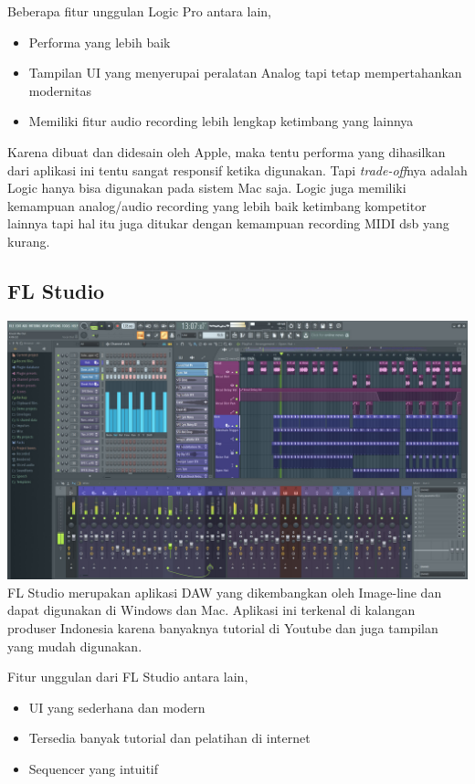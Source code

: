 \documentclass[12pt,a4paper]{report}
\begin{document}
  Beberapa fitur unggulan Logic Pro antara lain,

  \begin{itemize}
  \item
    Performa yang lebih baik
  \item
    Tampilan UI yang menyerupai peralatan
    Analog tapi tetap mempertahankan modernitas
  \item
    Memiliki fitur audio recording lebih lengkap ketimbang yang lainnya
  \end{itemize}

  Karena dibuat dan didesain oleh Apple, maka tentu performa yang
  dihasilkan dari aplikasi ini tentu sangat responsif ketika digunakan.
  Tapi \emph{trade-off}nya adalah Logic hanya bisa digunakan pada sistem
  Mac saja. Logic juga memiliki kemampuan analog/audio recording yang
  lebih baik ketimbang kompetitor lainnya tapi hal itu juga ditukar dengan
  kemampuan recording MIDI dsb yang kurang.

  \subsection*{FL Studio}\label{fl-studio}

  \includegraphics[width=\textwidth]{images/flstudio.jpg}
  FL Studio merupakan aplikasi DAW yang dikembangkan oleh Image-line dan dapat digunakan di Windows dan
  Mac. Aplikasi ini terkenal di kalangan produser Indonesia karena
  banyaknya tutorial di Youtube dan juga tampilan yang mudah digunakan.

  Fitur unggulan dari FL Studio antara lain,

  \begin{itemize}
  \item
    UI yang sederhana dan modern
  \item
    Tersedia banyak tutorial dan pelatihan di internet
  \item
    Sequencer yang intuitif
  \end{itemize}
\end{document}
